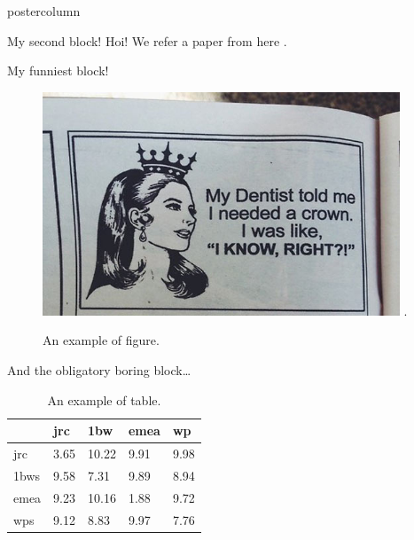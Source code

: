 \documentclass[roundedcorners=true, titleposition=left]{beamerthemeruhuisstijlposter}
\begin{document}
\begin{frame}
\begin{columns}
\begin{column}{0.19\textwidth}
\begin{beamercolorbox}[center, wd=\textwidth]{postercolumn}
\begin{minipage}[T]{0.95\textwidth}
\parbox[t][\columnheight]{\textwidth}{%
  \begin{block}{My second block!}
  	Hoi! We refer a paper from here \cite{lamport,kopka}.
  \end{block}
  \medskip
  \begin{block}{My funniest block!}
    \begin{figure}[H]
      \centering
      \includegraphics[width=0.95\textwidth]{funnygirl}
      \DeclareGraphicsExtensions.
      \caption{An example of figure.}
    \end{figure}
  \end{block}
  \medskip
  \begin{block}{And the obligatory boring block\ldots}
    \begin{table}[H]
      \centering
      \caption{An example of table.}
    	\begin{tabular}{lllll}
        \toprule
             & jrc  & 1bw   & emea & wp   \\
        \midrule
        jrc  & 3.65 & 10.22 & 9.91 & 9.98 \\
        1bws & 9.58 & 7.31  & 9.89 & 8.94 \\
        emea & 9.23 & 10.16 & 1.88 & 9.72 \\
        wps  & 9.12 & 8.83  & 9.97 & 7.76 \\
        \bottomrule
      \end{tabular}
    \end{table}
  \end{block}
}
\end{minipage}
\end{beamercolorbox}
\end{column}


\end{columns}
\end{frame}
\end{document}
